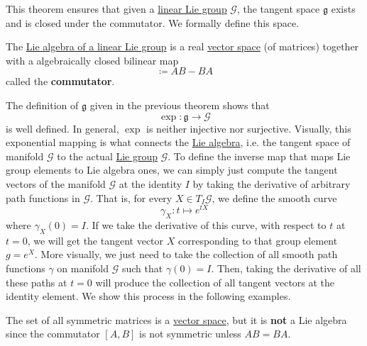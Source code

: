 \documentclass{article}
\newcounter{theorem}[section]
\newcounter{definition}[section]
\newcounter{example}[section]
\begin{document}
    This theorem ensures that given a \hyperref[def:linear-lie-group]{linear Lie group} $\mathcal{G}$, the tangent space $\mathfrak{g}$ exists and is closed under the commutator. We formally define this space. 

    \begin{definition}
      \label{def:lie-bracket-as-the-commutator}
      The \hyperref[thm:lie-algebra-of-a-linear-lie-group]{Lie algebra of a linear Lie group} is a real \hyperref[lin-def:vector-space]{vector space} (of matrices) together with a algebraically closed bilinear map 
      \begin{equation}
        [A,B] \coloneqq A B - B A
      \end{equation}
      called the \textbf{commutator}. 
    \end{definition} 

    The definition of $\mathfrak{g}$ given in the previous theorem shows that 
    \begin{equation}
      \exp: \mathfrak{g} \rightarrow \mathcal{G}
    \end{equation}
    is well defined. In general, $\exp$ is neither injective nor surjective. Visually, this exponential mapping is what connects the \hyperref[def:lie-algebra]{Lie algebra}, i.e. the tangent space of manifold $\mathcal{G}$ to the actual \hyperref[def:lie-group]{Lie group} $\mathcal{G}$. To define the inverse map that maps Lie group elements to Lie algebra ones, we can simply just compute the tangent vectors of the manifold $\mathcal{G}$ at the identity $I$ by taking the derivative of arbitrary path functions in $\mathcal{G}$. That is, for every $X \in T_I \mathcal{G}$, we define the smooth curve 
    \begin{equation}
      \gamma_X: t \mapsto e^{tX}
    \end{equation}
    where $\gamma_X(0) = I$. If we take the derivative of this curve, with respect to $t$ at $t = 0$, we will get the tangent vector $X$ corresponding to that group element $g = e^{X}$. More visually, we just need to take the collection of all smooth path functions $\gamma$ on manifold $\mathcal{G}$ such that $\gamma(0) = I$. Then, taking the derivative of all these paths at $t = 0$ will produce the collection of all tangent vectors at the identity element. We show this process in the following examples. 

    \begin{example}
      \label{ex:symmetric-matrices-do-not-form-a-lie-algebra}
      The set of all symmetric matrices is a \hyperref[lin-def:vector-space]{vector space}, but it is \textbf{not} a Lie algebra since the commutator $[A,B]$ is not symmetric unless $A B = B A$. 
    \end{example}
\end{document}
